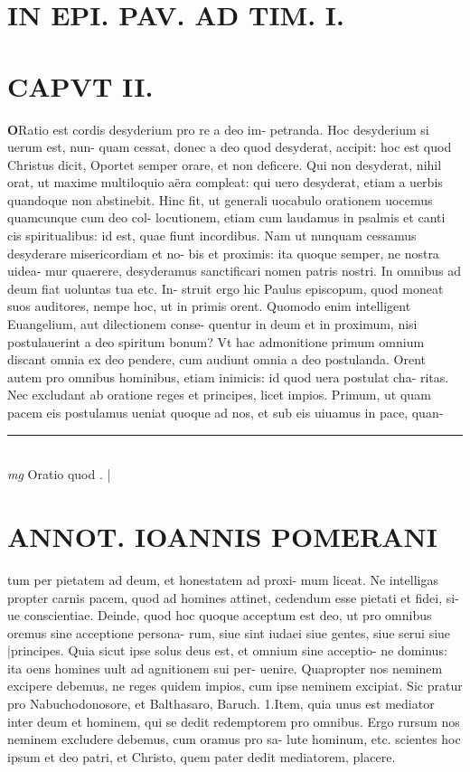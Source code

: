 \documentclass{article}
\begin{document}
\begin{pages}
\section*{IN EPI. PAV. AD TIM. I. }
\marginpar{[ p.83 ]}
\endnumbering\beginnumbering\section{CAPVT II.}\pstart \huge\textbf{O}\normalsize Ratio est cordis desyderium pro re a deo im- petranda. Hoc desyderium si uerum est, nun- quam cessat, donec a deo quod desyderat, accipit: hoc est quod Christus dicit, Oportet semper orare, et non deficere. Qui non desyderat, nihil orat, ut maxime multiloquio aëra compleat: qui uero desyderat, etiam a uerbis quandoque  non abstinebit. Hinc fit, ut generali uocabulo orationem uocemus quamcunque  cum deo col- locutionem, etiam cum laudamus in psalmis et canti cis spiritualibus: id est, quae fiunt incordibus. Nam ut nunquam cessamus desyderare misericordiam et no- bis et proximis: ita quoque  semper, ne nostra uidea- mur quaerere, desyderamus sanctificari nomen patris nostri. In omnibus ad deum fiat uoluntas tua etc. In- struit ergo hic Paulus episcopum, quod moneat suos auditores, nempe hoc, ut in primis orent. Quomodo enim intelligent Euangelium, aut dilectionem conse- quentur in deum et in proximum, nisi postulauerint a deo spiritum bonum? Vt hac admonitione primum omnium discant omnia ex deo pendere, cum audiunt omnia a deo postulanda. Orent autem pro omnibus hominibus, etiam inimicis: id quod uera postulat cha- ritas. Nec excludant ab oratione reges et principes, licet impios. Primum, ut quam pacem eis postulamus ueniat quoque  ad nos, et sub eis uiuamus in pace, quan-  \pend
\vspace{0.5cm}\noindent
\vspace{0.2cm}\rule{1cm}{0.2pt}\\ 
\hspace{0.2cm}\textit{mg}
\footnotesize Oratio quod . 
\normalsize| 
\section*{ANNOT. IOANNIS POMERANI }\pstart tum per pietatem ad deum, et honestatem ad proxi- mum liceat. Ne intelligas propter carnis pacem, quod ad homines attinet, cedendum esse pietati et fidei, si- ue conscientiae. Deinde, quod hoc quoque  acceptum est deo, ut pro omnibus oremus sine acceptione persona- rum, siue sint iudaei siue gentes, siue serui siue |principes. Quia sicut ipse solus deus est, et omnium sine acceptio- ne dominus: ita oens homines uult ad agnitionem sui per- uenire. Quapropter nos neminem excipere debemus, ne reges quidem impios, cum ipse neminem excipiat. Sic pratur pro Nabuchodonosore, et Balthasaro, Baruch. 1.Item, quia unus est mediator inter deum et hominem, qui se dedit redemptorem pro omnibus. Ergo rursum nos neminem excludere debemus, cum oramus pro sa- lute hominum, etc. scientes hoc ipsum et deo patri, et Christo, quem pater dedit mediatorem, placere.  \pend
{}
{}

\end{pages}
\end{document}
